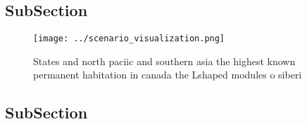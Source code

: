 \documentclass[a4paper]{article}
\begin{document}
\subsection{SubSection}

\begin{figure}
\centering
\texttt{[image: ../scenario\_visualization.png]}
\caption{States and north paciic and southern asia the highest known permanent habitation in canada the Lshaped modules o siberi
}
\end{figure}
 
\subsection{SubSection}
\end{document}
